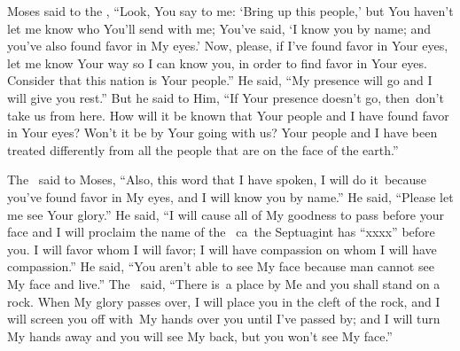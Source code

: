 \begin{inparaenum}
   Moses said to the \lord, ``Look, You say to me: `Bring up this people,' but You haven't let me know who You'll send with me; You've said, `I know you by name; and you've also found favor in My eyes.'%
   Now, please, if I've found favor in Your eyes, let me know Your way so I can know you, in order to find favor in Your eyes. Consider that this nation is Your people.''%
   He said, ``My presence will go and I will give you rest.''%
   But he said to Him, ``If Your presence doesn't go, then\understood{}\ don't take us from here.%
   How will it be known that Your people and I have found favor in Your eyes? Won't it be by Your going with us? Your people and I have been treated differently from all the people that are on the face of the earth.''%

   The \lord\ said to Moses, ``Also, this word that I have spoken, I will do it\understood{}\ because you've found favor in My eyes, and I will know you by name.''%
   He said, ``Please let me see Your glory.''%
   He said, ``I will cause all of My goodness to pass before your face and I will proclaim the name of the \lord\ ca{\septuagint\ }{the Septuagint has ``xxxx''} before you. I will favor whom I will favor; I will have compassion on whom I will have compassion.''%
   He said, ``You aren't able to see My face because man cannot see My face and live.''%
   The \lord\ said, ``There is\understood{}\ a place by Me and you shall stand on a rock.%
   When My glory passes over, I will place you in the cleft of the rock, and I will screen you off with\understood{}\ My hands over you until I've passed by;%
   and I will turn My hands away and you will see My back, but you won't see My face.''%
\end{inparaenum}
